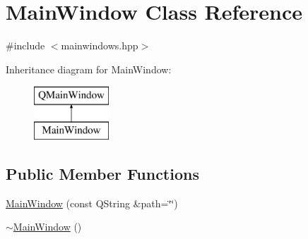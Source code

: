 \hypertarget{class_main_window}{\section{Main\+Window Class Reference}
\label{class_main_window}
}


{\ttfamily \#include $<$mainwindows.\+hpp$>$}

Inheritance diagram for Main\+Window\+:\begin{figure}[H]
\begin{center}
\leavevmode
\includegraphics[height=2.000000cm]{class_main_window}
\end{center}
\end{figure}
\subsection*{Public Member Functions}
\begin{DoxyCompactItemize}
\item 
\hyperlink{class_main_window_a6d90fb41049be49da652a628191c9a1d}{Main\+Window} (const Q\+String \&path=\char`\"{}\char`\"{})
\item 
\hyperlink{class_main_window_ae98d00a93bc118200eeef9f9bba1dba7}{$\sim$\+Main\+Window} ()
\end{DoxyCompactItemize}
